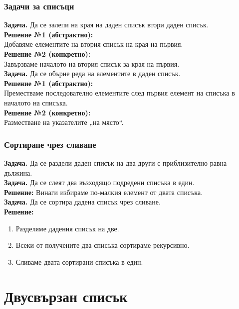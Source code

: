\documentclass[alsotrans,beameroptions={aspectratio=169}]{beamerswitch}
\begin{document}
\begin{frame}
  \frametitle{Задачи за списъци}

  \textbf{Задача.} Да се залепи на края на даден списък втори даден списък.\\[2ex]
  \pause
  \textbf{Решение №1 (абстрактно):} \\
  Добавяме елементите на втория списък на края на първия.\\[2ex]
  \pause
  \textbf{Решение №2 (конкретно):} \\
  Завързваме началото на втория списък за края на първия.\\[2ex]
  \pause\pause
  \textbf{Задача.} Да се обърне реда на елементите в даден списък.\\[2ex]
  \pause
  \textbf{Решение №1 (абстрактно):}\\
  Преместваме последователно елементите след първия елемент на списъка в началото на списъка.\\[2ex]
  \pause
  \textbf{Решение №2 (конкретно):}\\
  Разместване на указателите „на място“.
\end{frame}

\begin{frame}
  \frametitle{Сортиране чрез сливане}

  \textbf{Задача.} Да се раздели даден списък на два други с приблизително равна дължина.\\[2ex]
  \pause
  \textbf{Задача.} Да се слеят два възходящо подредени списъка в един.\\
  \pause
  \textbf{Решение:} Винаги избираме по-малкия елемент от двата списъка.\\[2ex]
  \pause
  \textbf{Задача.} Да се сортира дадена списък чрез сливане.\\
  \pause
  \textbf{Решение:}
  \begin{enumerate}
  \item Разделяме дадения списък на две.
  \item Всеки от получените два списъка сортираме рекурсивно.
  \item Сливаме двата сортирани списъка в един.
  \end{enumerate}
\end{frame}

\section{Двусвързан списък}
\end{document}
